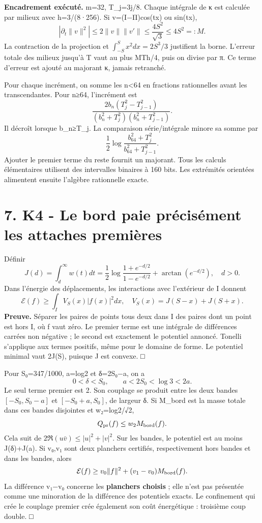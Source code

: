\documentclass[
  10pt,
  a4paper,
]{article}
\begin{document}
\textbf{Encadrement exécuté.} m=32, T\_j=3j/8. Chaque intégrale de κ est
calculée par milieux avec h=3/(8·256). Si v=(I−Π)cos(tx) ou sin(tx), \[
|\partial_t\|v\|^2|\le2\|v\|\|v'\|
\le\frac{4S^2}{\sqrt3}\le4S^2=:M.
\] La contraction de la projection et \(\int_{-S}^Sx^2dx=2S^3/3\)
justifient la borne. L'erreur totale des milieux jusqu'à T vaut au plus
MTh/4, puis on divise par π. Ce terme d'erreur est ajouté au majorant κ,
jamais retranché.

Pour chaque incrément, on somme les n\textless64 en fractions
rationnelles avant les transcendantes. Pour n≥64, l'incrément est \[
\frac{2b_n(T_j^2-T_{j-1}^2)}
{(b_n^2+T_j^2)(b_n^2+T_{j-1}^2)}.
\] Il décroît lorsque b\_n≥T\_j. La comparaison série/intégrale minore
sa somme par \[
\frac12\log\frac{b_{64}^2+T_j^2}{b_{64}^2+T_{j-1}^2}.
\] Ajouter le premier terme du reste fournit un majorant. Tous les
calculs élémentaires utilisent des intervalles binaires à 160 bits. Les
extrémités orientées alimentent ensuite l'algèbre rationnelle exacte.

\hypertarget{k4---le-bord-paie-pruxe9cisuxe9ment-les-attaches-premiuxe8res}{%
\section{7. K4 - Le bord paie précisément les attaches
premières}\label{k4---le-bord-paie-pruxe9cisuxe9ment-les-attaches-premiuxe8res}}

Définir \[
J(d)=\int_d^\infty w(t)dt
=\frac12\log\frac{1+e^{-d/2}}{1-e^{-d/2}}+\arctan(e^{-d/2}),\quad d>0.
\] Dans l'énergie des déplacements, les interactions avec l'extérieur de
I donnent \[
\mathcal E(f)\ge\int_I V_S(x)|f(x)|^2dx,
\quad V_S(x)=J(S-x)+J(S+x).
\] \textbf{Preuve.} Séparer les paires de points tous deux dans I des
paires dont un point est hors I, où f vaut zéro. Le premier terme est
une intégrale de différences carrées non négative ; le second est
exactement le potentiel annoncé. Tonelli s'applique aux termes positifs,
même pour le domaine de forme. Le potentiel minimal vaut 2J(S), puisque
J est convexe. □

Pour S₀=347/1000, a=log2 et δ=2S₀−a, on a \[
0<\delta<S_0,\qquad a<2S_0<\log3<2a.
\] Le seul terme premier est 2. Son couplage se produit entre les deux
bandes \([-S_0,S_0-a]\) et \([-S_0+a,S_0]\), de largeur δ. Si M\_bord
est la masse totale dans ces bandes disjointes et w₂=log2/√2, \[
Q_{\rm pr}(f)\le w_2M_{\rm bord}(f).
\] Cela suit de \(2\Re(u\bar v)\le|u|^2+|v|^2\). Sur les bandes, le
potentiel est au moins J(δ)+J(a). Si v₀,v₁ sont deux planchers
certifiés, respectivement hors bandes et dans les bandes, alors \[
\mathcal E(f)\ge v_0\|f\|^2+(v_1-v_0)M_{\rm bord}(f).
\] La différence v₁−v₀ concerne les \textbf{planchers choisis} ; elle
n'est pas présentée comme une minoration de la différence des potentiels
exacts. Le confinement qui crée le couplage premier crée également son
coût énergétique : troisième coup double. □
\end{document}
